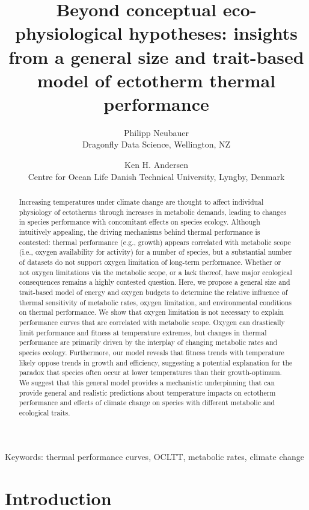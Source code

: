 \documentclass[a4paper, toc=index,abstract=true]{scrartcl}\usepackage[]{graphicx}\usepackage[]{color}
\title{Beyond conceptual eco-physiological hypotheses: insights from a general size and trait-based model of ectotherm thermal performance}
\author{Philipp Neubauer\\Dragonfly Data Science, Wellington, NZ  \and 
        Ken H. Andersen\\Centre for Ocean Life
        Danish Technical University, Lyngby, Denmark}
\begin{document}
\maketitle

\begin{spacing}{1.9}

\begin{abstract}

Increasing temperatures under climate change are thought to affect individual physiology of ectotherms through increases in metabolic demands, leading to changes in species performance with concomitant effects on species ecology. Although intuitively appealing, the driving mechanisms behind thermal performance is contested: thermal performance (e.g., growth) appears correlated with metabolic scope (i.e., oxygen availability for activity) for a number of species, but a substantial number of datasets do not support oxygen limitation of long-term performance. Whether or not oxygen limitations via the metabolic scope, or a lack thereof, have major ecological consequences remains a highly contested question. Here, we propose a general size and trait-based model of energy and oxygen budgets to determine the relative influence of thermal sensitivity of metabolic rates, oxygen limitation, and environmental conditions on thermal performance. We show that oxygen limitation is not necessary to explain performance curves that are correlated with metabolic scope. Oxygen can drastically limit performance and fitness at temperature extremes, but changes in thermal performance are primarily driven by the interplay of changing metabolic rates and species ecology. Furthermore, our model reveals that fitness trends with temperature likely oppose trends in growth and efficiency, suggesting a potential explanation for the paradox that species often occur at lower temperatures than their growth-optimum. We suggest that this general model provides a mechanistic underpinning that can provide general and realistic predictions about temperature impacts on ectotherm performance and effects of climate change on species with different metabolic and ecological traits.

\end{abstract}
{\large Keywords:} thermal performance curves, OCLTT, metabolic rates, climate change

\newpage

\section{Introduction}


\end{spacing}
\end{document}
